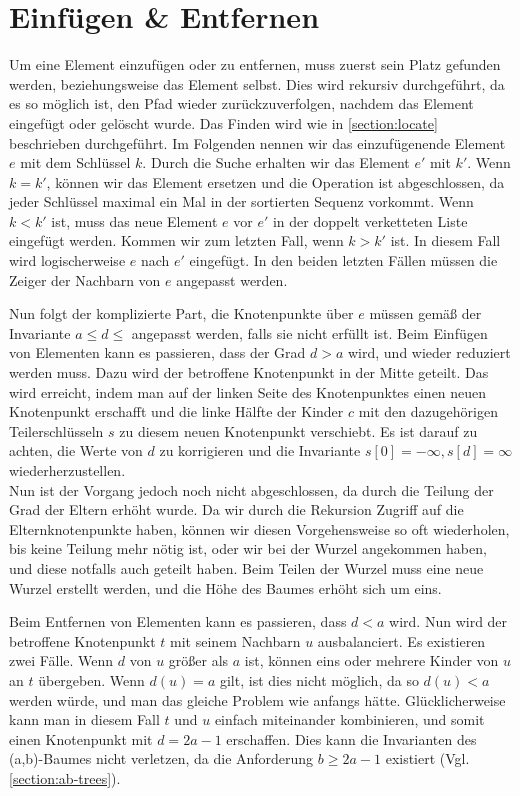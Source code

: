 \section{Einfügen \& Entfernen}
\label{section:insert-remove}

Um eine Element einzufügen oder zu entfernen, muss zuerst sein Platz gefunden werden, beziehungsweise das Element selbst. Dies wird rekursiv durchgeführt, da es so möglich ist, den Pfad wieder zurückzuverfolgen, nachdem das Element eingefügt oder gelöscht wurde. Das Finden wird wie in \autoref{section:locate} beschrieben durchgeführt. Im Folgenden nennen wir das einzufügenende Element $e$ mit dem Schlüssel $k$. Durch die Suche erhalten wir das Element $e'$ mit $k'$. Wenn $k = k'$, können wir das Element ersetzen und die Operation ist abgeschlossen, da jeder Schlüssel maximal ein Mal in der sortierten Sequenz vorkommt. Wenn $k < k'$ ist, muss das neue Element $e$ vor $e'$ in der doppelt verketteten Liste eingefügt werden. Kommen wir zum letzten Fall, wenn $k > k'$ ist. In diesem Fall wird logischerweise $e$ nach $e'$ eingefügt. In den beiden letzten Fällen müssen die Zeiger der Nachbarn von $e$ angepasst werden.
\par
Nun folgt der komplizierte Part, die Knotenpunkte über $e$ müssen gemäß der Invariante $a \leq d \leq$ angepasst werden, falls sie nicht erfüllt ist. Beim Einfügen von Elementen kann es passieren, dass der Grad $d > a$ wird, und wieder reduziert werden muss. Dazu wird der betroffene Knotenpunkt in der Mitte geteilt. Das wird erreicht, indem man auf der linken Seite des Knotenpunktes einen neuen Knotenpunkt erschafft und die linke Hälfte der Kinder $c$ mit den dazugehörigen Teilerschlüsseln $s$ zu diesem neuen Knotenpunkt verschiebt. Es ist darauf zu achten, die Werte von $d$ zu korrigieren und die Invariante $s[0] = - \infty, s[d] = \infty$ wiederherzustellen.
\\
Nun ist der Vorgang jedoch noch nicht abgeschlossen, da durch die Teilung der Grad der Eltern erhöht wurde. Da wir durch die Rekursion Zugriff auf die Elternknotenpunkte haben, können wir diesen Vorgehensweise so oft wiederholen, bis keine Teilung mehr nötig ist, oder wir bei der Wurzel angekommen haben, und diese notfalls auch geteilt haben. Beim Teilen der Wurzel muss eine neue Wurzel erstellt werden, und die Höhe des Baumes erhöht sich um eins.
\par
Beim Entfernen von Elementen kann es passieren, dass $d < a$ wird. Nun wird der betroffene Knotenpunkt $t$ mit seinem Nachbarn $u$ ausbalanciert. Es existieren zwei Fälle. Wenn $d$ von $u$ größer als $a$ ist, können eins oder mehrere Kinder von $u$ an $t$ übergeben. Wenn $d(u) = a$ gilt, ist dies nicht möglich, da so $d(u) < a$ werden würde, und man das gleiche Problem wie anfangs hätte. Glücklicherweise kann man in diesem Fall $t$ und $u$ einfach miteinander kombinieren, und somit einen Knotenpunkt mit $d = 2a-1$ erschaffen. Dies kann die Invarianten des (a,b)-Baumes nicht verletzen, da die Anforderung $b \geq 2a-1$ existiert (Vgl. \autoref{section:ab-trees}).
